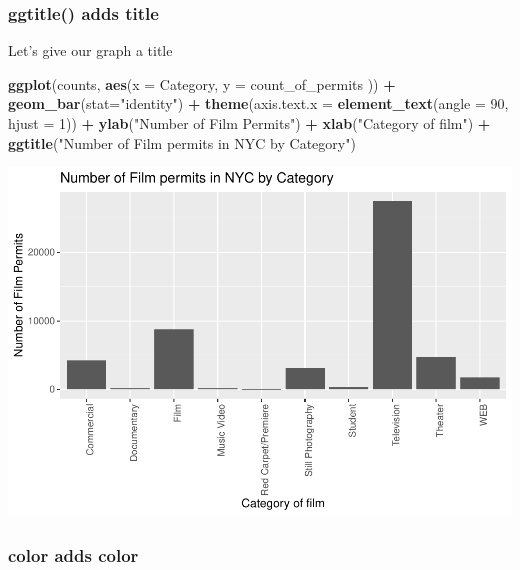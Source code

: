 \documentclass[]{book}
\newenvironment{Shaded}{\begin{snugshade}}{\end{snugshade}}
\newcommand{\KeywordTok}[1]{\textcolor[rgb]{0.13,0.29,0.53}{\textbf{#1}}}
\newcommand{\DataTypeTok}[1]{\textcolor[rgb]{0.13,0.29,0.53}{#1}}
\newcommand{\DecValTok}[1]{\textcolor[rgb]{0.00,0.00,0.81}{#1}}
\newcommand{\StringTok}[1]{\textcolor[rgb]{0.31,0.60,0.02}{#1}}
\newcommand{\OperatorTok}[1]{\textcolor[rgb]{0.81,0.36,0.00}{\textbf{#1}}}
\newcommand{\NormalTok}[1]{#1}
\begin{document}
\subsubsection{ggtitle() adds title}\label{ggtitle-adds-title}

Let's give our graph a title

\begin{Shaded}
\begin{Highlighting}[]
\KeywordTok{ggplot}\NormalTok{(counts, }\KeywordTok{aes}\NormalTok{(}\DataTypeTok{x =}\NormalTok{ Category, }\DataTypeTok{y =}\NormalTok{ count_of_permits )) }\OperatorTok{+}
\StringTok{  }\KeywordTok{geom_bar}\NormalTok{(}\DataTypeTok{stat=}\StringTok{"identity"}\NormalTok{) }\OperatorTok{+}\StringTok{ }
\StringTok{  }\KeywordTok{theme}\NormalTok{(}\DataTypeTok{axis.text.x =} \KeywordTok{element_text}\NormalTok{(}\DataTypeTok{angle =} \DecValTok{90}\NormalTok{, }\DataTypeTok{hjust =} \DecValTok{1}\NormalTok{)) }\OperatorTok{+}
\StringTok{  }\KeywordTok{ylab}\NormalTok{(}\StringTok{"Number of Film Permits"}\NormalTok{) }\OperatorTok{+}\StringTok{ }
\StringTok{  }\KeywordTok{xlab}\NormalTok{(}\StringTok{"Category of film"}\NormalTok{) }\OperatorTok{+}
\StringTok{  }\KeywordTok{ggtitle}\NormalTok{(}\StringTok{"Number of Film permits in NYC by Category"}\NormalTok{)}
\end{Highlighting}
\end{Shaded}

\includegraphics{Statistics_Lab_files/figure-latex/1categoryE-1.pdf}

\subsubsection{color adds color}\label{color-adds-color}
\end{document}
